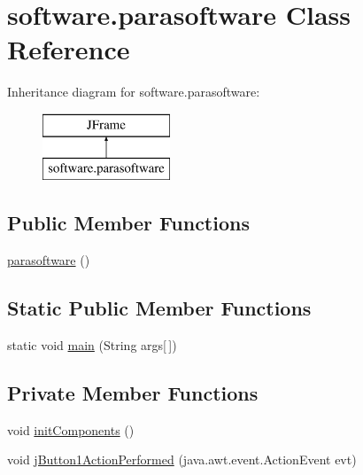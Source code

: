 \hypertarget{classsoftware_1_1parasoftware}{}\section{software.\+parasoftware Class Reference}
\label{classsoftware_1_1parasoftware}
Inheritance diagram for software.\+parasoftware\+:\begin{figure}[H]
\begin{center}
\leavevmode
\includegraphics[height=2.000000cm]{classsoftware_1_1parasoftware}
\end{center}
\end{figure}
\subsection*{Public Member Functions}
\begin{DoxyCompactItemize}
\item 
\mbox{\hyperlink{classsoftware_1_1parasoftware_aee631de1591fd8804c777c8beab9064e}{parasoftware}} ()
\end{DoxyCompactItemize}
\subsection*{Static Public Member Functions}
\begin{DoxyCompactItemize}
\item 
static void \mbox{\hyperlink{classsoftware_1_1parasoftware_a418767cd95088fa926d9d21e1ffb5a06}{main}} (String args\mbox{[}$\,$\mbox{]})
\end{DoxyCompactItemize}
\subsection*{Private Member Functions}
\begin{DoxyCompactItemize}
\item 
void \mbox{\hyperlink{classsoftware_1_1parasoftware_a485d53980d60034cc879c27abd275f6f}{init\+Components}} ()
\item 
void \mbox{\hyperlink{classsoftware_1_1parasoftware_a866edce40eadaed5d0c19446719b43e6}{j\+Button1\+Action\+Performed}} (java.\+awt.\+event.\+Action\+Event evt)
\end{DoxyCompactItemize}

